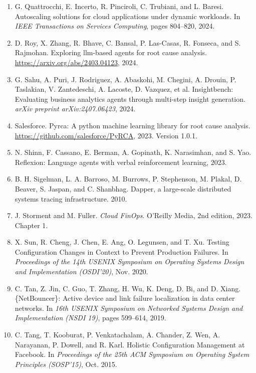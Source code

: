 \documentclass[10pt,UTF8,fontset=fandol]{ctexart}
\begin{document}
\begin{enumerate}[leftmargin=2em,itemsep=2pt]
\item G. Quattrocchi, E. Incerto, R. Pinciroli, C. Trubiani, and L. Baresi. Autoscaling solutions for cloud applications under dynamic workloads. In \textit{IEEE Transactions on Services Computing}, pages 804--820, 2024.

\item D. Roy, X. Zhang, R. Bhave, C. Bansal, P. Las-Casas, R. Fonseca, and S. Rajmohan. Exploring llm-based agents for root cause analysis. \url{https://arxiv.org/abs/2403.04123}, 2024.

\item G. Sahu, A. Puri, J. Rodriguez, A. Abaskohi, M. Chegini, A. Drouin, P. Taslakian, V. Zantedeschi, A. Lacoste, D. Vazquez, et al. Insightbench: Evaluating business analytics agents through multi-step insight generation. \textit{arXiv preprint arXiv:2407.06423}, 2024.

\item Salesforce. Pyrca: A python machine learning library for root cause analysis. \url{https://github.com/salesforce/PyRCA}, 2023. Version 1.0.1.

\item N. Shinn, F. Cassano, E. Berman, A. Gopinath, K. Narasimhan, and S. Yao. Reflexion: Language agents with verbal reinforcement learning, 2023.

\item B. H. Sigelman, L. A. Barroso, M. Burrows, P. Stephenson, M. Plakal, D. Beaver, S. Jaspan, and C. Shanbhag. Dapper, a large-scale distributed systems tracing infrastructure. 2010.

\item J. Storment and M. Fuller. \textit{Cloud FinOps}. O'Reilly Media, 2nd edition, 2023. Chapter 1.

\item X. Sun, R. Cheng, J. Chen, E. Ang, O. Legunsen, and T. Xu. Testing Configuration Changes in Context to Prevent Production Failures. In \textit{Proceedings of the 14th USENIX Symposium on Operating Systems Design and Implementation (OSDI'20)}, Nov. 2020.

\item C. Tan, Z. Jin, C. Guo, T. Zhang, H. Wu, K. Deng, D. Bi, and D. Xiang. \{NetBouncer\}: Active device and link failure localization in data center networks. In \textit{16th USENIX Symposium on Networked Systems Design and Implementation (NSDI 19)}, pages 599--614, 2019.

\item C. Tang, T. Kooburat, P. Venkatachalam, A. Chander, Z. Wen, A. Narayanan, P. Dowell, and R. Karl. Holistic Configuration Management at Facebook. In \textit{Proceedings of the 25th ACM Symposium on Operating System Principles (SOSP'15)}, Oct. 2015.


\end{enumerate}
\end{document}
